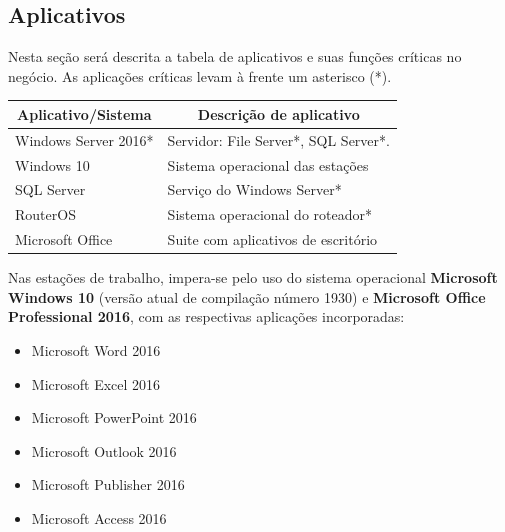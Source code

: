 \documentclass[	DIV=calc,%
							paper=a4,%
							fontsize=12pt,%
							onecolumn]{scrartcl}	 					%
\begin{document}
\subsection{Aplicativos}

Nesta seção será descrita a tabela de aplicativos e suas funções críticas no negócio. As aplicações críticas levam à frente um asterisco (*).




\begin{table}[H]
	\centering
	\renewcommand{\arraystretch}{2.0}
	\begin{tabular}{|l|l|}
		\hline
		\multicolumn{1}{|c|}{\textbf{Aplicativo/Sistema}} &	 \multicolumn{1}{|c|}{\textbf{Descrição  de aplicativo}}                                 		  \\ \hline
		Windows Server 2016*                               
		& Servidor: File Server*, SQL Server*.                                               \\ \hline
		Windows 10                             
		& Sistema operacional das estações           					\\ \hline
		SQL Server                                  
		& Serviço do Windows Server*         \\ \hline
		RouterOS
		& Sistema operacional do roteador*        \\ \hline
		Microsoft Office                                  
		& Suite com aplicativos de escritório   \\ \hline
	\end{tabular}
\end{table}


Nas estações de trabalho, impera-se pelo uso do sistema operacional \textbf{Microsoft Windows 10} (versão atual de compilação número 1930) e \textbf{Microsoft Office Professional 2016}, com as respectivas aplicações incorporadas: \\ 

\begin{itemize}
	\item Microsoft Word 2016 
	\item Microsoft Excel 2016
	\item Microsoft PowerPoint 2016
	\item Microsoft Outlook 2016
	\item Microsoft Publisher 2016
	\item Microsoft Access 2016
\end{itemize}
\end{document}

